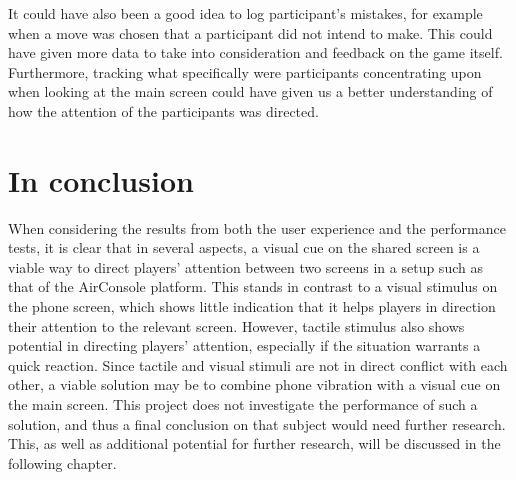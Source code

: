 It could have also been a good idea to log participant’s mistakes, for example when a move was chosen that a participant did not intend to make. This could have given more data to take into consideration and feedback on the game itself. Furthermore, tracking what specifically were participants concentrating upon when looking at the main screen could have given us a better understanding of how the attention of the participants was directed. 

\section{In conclusion}
When considering the results from both the user experience and the performance tests, it is clear that in several aspects, a visual cue on the shared screen is a viable way to direct players' attention between two screens in a setup such as that of the AirConsole platform. This stands in contrast to a visual stimulus on the phone screen, which shows little indication that it helps players in direction their attention to the relevant screen. However, tactile stimulus also shows potential in directing players' attention, especially if the situation warrants a quick reaction. Since tactile and visual stimuli are not in direct conflict with each other, a viable solution may be to combine phone vibration with a visual cue on the main screen. This project does not investigate the performance of such a solution, and thus a final conclusion on that subject would need further research. This, as well as additional potential for further research, will be discussed in the following chapter.